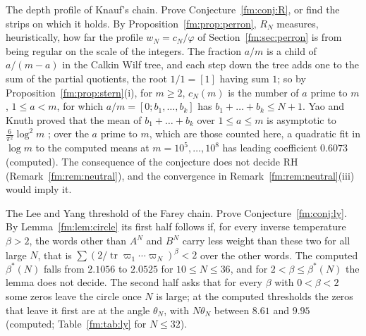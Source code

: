 \begin{problem}\label{fm:prob:profile}
The depth profile of Knauf's chain. Prove Conjecture~\ref{fm:conj:R}, or find the strips on which it holds. By Proposition~\ref{fm:prop:perron}, $R_N$ measures, heuristically, how far the profile $w_N=c_N/\varphi$ of Section~\ref{fm:sec:perron} is from being regular on the scale of the integers. The fraction $a/m$ is a child of $a/(m-a)$ in the Calkin Wilf tree, and each step down the tree adds one to the sum of the partial quotients, the root $1/1=[1]$ having sum $1$; so by Proposition~\ref{fm:prop:stern}(i), for $m\ge2$, $c_N(m)$ is the number of $a$ prime to $m$, $1\le a<m$, for which $a/m=[0;b_1,\dots,b_k]$ has $b_1+\dots+b_k\le N+1$. Yao and Knuth proved that the mean of $b_1+\dots+b_k$ over $1\le a\le m$ is asymptotic to $\frac6{\pi^2}\log^2m$ \cite{YaoKnuth75}; over the $a$ prime to $m$, which are those counted here, a quadratic fit in $\log m$ to the computed means at $m=10^5,\dots,10^8$ has leading coefficient $0.6073$ (computed). The consequence of the conjecture does not decide RH (Remark~\ref{fm:rem:neutral}), and the convergence in Remark~\ref{fm:rem:neutral}(iii) would imply it.
\end{problem}

\begin{problem}\label{fm:prob:fareyly}
The Lee and Yang threshold of the Farey chain. Prove Conjecture~\ref{fm:conj:ly}. By Lemma~\ref{fm:lem:circle} its first half follows if, for every inverse temperature $\beta>2$, the words other than $A^N$ and $B^N$ carry less weight than these two for all large $N$, that is $\sum(2/\operatorname{tr}\varpi_1\cdots\varpi_N)^\beta<2$ over the other words. The computed $\beta^*(N)$ falls from $2.1056$ to $2.0525$ for $10\le N\le36$, and for $2<\beta\le\beta^*(N)$ the lemma does not decide. The second half asks that for every $\beta$ with $0<\beta<2$ some zeros leave the circle once $N$ is large; at the computed thresholds the zeros that leave it first are at the angle $\theta_N$, with $N\theta_N$ between $8.61$ and $9.95$ (computed; Table~\ref{fm:tab:ly} for $N\le32$).
\end{problem}
